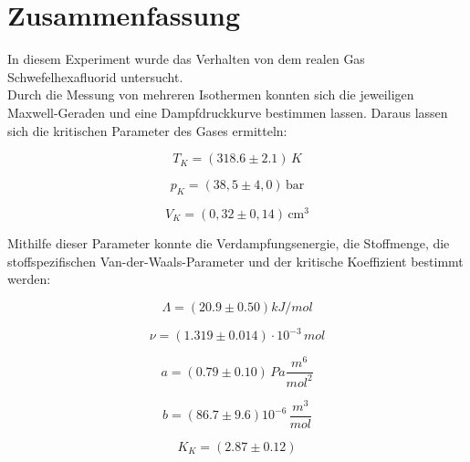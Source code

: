 \section{Zusammenfassung}
\label{sec:Zusammenfassung}

In diesem Experiment wurde das Verhalten von dem realen Gas Schwefelhexafluorid untersucht. \\
Durch die Messung von mehreren Isothermen konnten sich die jeweiligen Maxwell-Geraden und eine Dampfdruckkurve bestimmen lassen. 
Daraus lassen sich die kritischen Parameter des Gases ermitteln:

\begin{equation*}
    T_K = (318.6 \pm 2.1) \, K  
\end{equation*}

\begin{equation*}
    p_K = (38,5 \pm 4,0) \, \text{bar}
\end{equation*}

\begin{equation*}
    V_K = (0,32 \pm 0,14) \, \text{cm}^3
\end{equation*}

Mithilfe dieser Parameter konnte die Verdampfungsenergie, die Stoffmenge, die stoffspezifischen Van-der-Waals-Parameter und der kritische Koeffizient bestimmt werden:

\begin{equation*}
    \Lambda = (20.9 \pm 0.50) kJ/mol
\end{equation*}

\begin{equation*}
    \nu = (1.319 \pm 0.014) \cdot 10^{-3} \, mol
\end{equation*}

\begin{equation*}
    a = (0.79 \pm 0.10) \, Pa \frac{m^6}{mol^2}
\end{equation*}

\begin{equation*}
    b = (86.7 \pm 9.6) 10^{-6} \, \frac{m^3}{mol}
\end{equation*}

\begin{equation*}
    K_K = (2.87 \pm 0.12)
\end{equation*}


